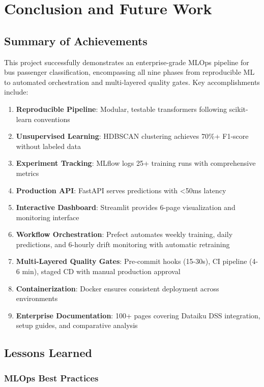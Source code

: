 \section{Conclusion and Future Work}

\subsection{Summary of Achievements}

This project successfully demonstrates an enterprise-grade MLOps pipeline for bus passenger classification, encompassing all nine phases from reproducible ML to automated orchestration and multi-layered quality gates. Key accomplishments include:

\begin{enumerate}
    \item \textbf{Reproducible Pipeline}: Modular, testable transformers following scikit-learn conventions
    \item \textbf{Unsupervised Learning}: HDBSCAN clustering achieves 70\%+ F1-score without labeled data
    \item \textbf{Experiment Tracking}: MLflow logs 25+ training runs with comprehensive metrics
    \item \textbf{Production API}: FastAPI serves predictions with <50ms latency
    \item \textbf{Interactive Dashboard}: Streamlit provides 6-page visualization and monitoring interface
    \item \textbf{Workflow Orchestration}: Prefect automates weekly training, daily predictions, and 6-hourly drift monitoring with automatic retraining
    \item \textbf{Multi-Layered Quality Gates}: Pre-commit hooks (15-30s), CI pipeline (4-6 min), staged CD with manual production approval
    \item \textbf{Containerization}: Docker ensures consistent deployment across environments
    \item \textbf{Enterprise Documentation}: 100+ pages covering Dataiku DSS integration, setup guides, and comparative analysis
\end{enumerate}

\subsection{Lessons Learned}

\subsubsection{MLOps Best Practices}

